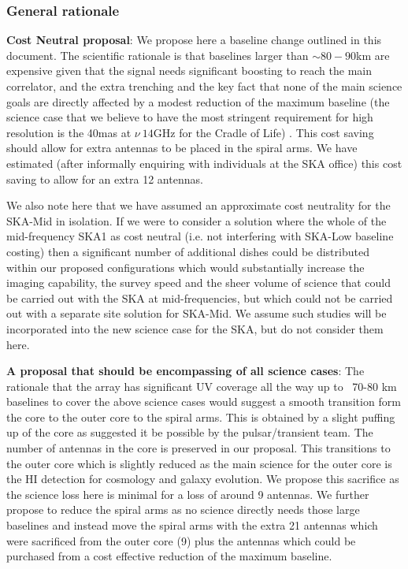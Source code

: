 \documentclass[sfheadings,a4paper,times,9pt,floats,floatfix]{article}
\begin{document}
\subsubsection{General rationale}

{\bf Cost Neutral proposal}: We propose here a baseline change outlined in this document. The scientific rationale is that
baselines larger than $\sim 80-90$km are expensive given that the signal needs significant boosting to
reach the main correlator, and the extra trenching and the key fact
that none of the main science goals are directly
affected by a modest reduction of the maximum baseline (the 
science case that we believe to have the most stringent requirement
for high resolution is the 40mas at $\nu~14$GHz for the Cradle of Life) . This cost saving should allow for
extra antennas to be placed in the spiral arms. We have estimated (after informally enquiring
with individuals at the SKA office) this cost saving to allow for an
extra 12 antennas. 

We also note here that we have assumed an approximate cost neutrality
for the SKA-Mid in isolation. If we were to consider a solution where the whole of the
mid-frequency SKA1 as cost neutral (i.e. not interfering with
SKA-Low baseline costing) then a significant number of additional dishes could be distributed
within our proposed configurations which would substantially increase the imaging
capability, the survey speed and the sheer volume of science that
could be carried out with the SKA at mid-frequencies, but which could
not be carried out with a separate site solution for SKA-Mid. We
assume such studies will be incorporated into the new science case for
the SKA, but do not consider them here.

{\bf A proposal that should be encompassing of all science cases}: The rationale that the array
has significant UV coverage all the way up to ~70-80 km baselines to cover the above
science cases would suggest a smooth transition form the core to the outer core to the
spiral arms. This is obtained by a slight puffing up of the core as suggested it be possible by
the pulsar/transient team. The number of antennas in the core is preserved in our
proposal. This transitions to the outer core which is slightly reduced as the main science for
the outer core is the HI detection for cosmology and galaxy evolution. We propose this sacrifice as
the science loss here is minimal for a loss of around 9 antennas. We further propose to
reduce the spiral arms as no science directly needs those large baselines and instead move
the spiral arms with the extra 21 antennas which were sacrificed from the outer core (9)
plus the antennas which could be purchased from a cost effective reduction of the
maximum baseline.
\end{document}
